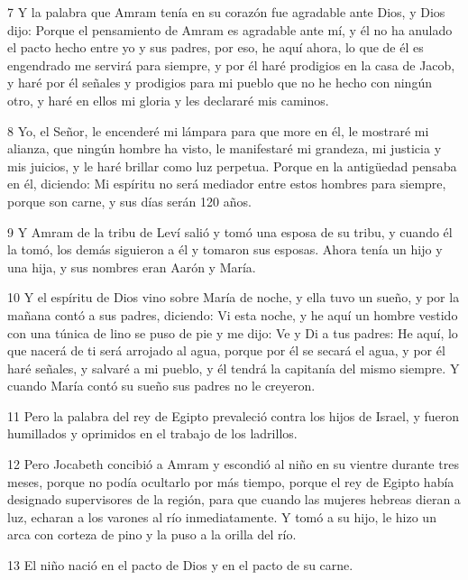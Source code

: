\par 7 Y la palabra que Amram tenía en su corazón fue agradable ante Dios, y Dios dijo: Porque el pensamiento de Amram es agradable ante mí, y él no ha anulado el pacto hecho entre yo y sus padres, por eso, he aquí ahora, lo que de él es engendrado me servirá para siempre, y por él haré prodigios en la casa de Jacob, y haré por él señales y prodigios para mi pueblo que no he hecho con ningún otro, y haré en ellos mi gloria y les declararé mis caminos.

\par 8 Yo, el Señor, le encenderé mi lámpara para que more en él, le mostraré mi alianza, que ningún hombre ha visto, le manifestaré mi grandeza, mi justicia y mis juicios, y le haré brillar como luz perpetua. Porque en la antigüedad pensaba en él, diciendo: Mi espíritu no será mediador entre estos hombres para siempre, porque son carne, y sus días serán 120 años.

\par 9 Y Amram de la tribu de Leví salió y tomó una esposa de su tribu, y cuando él la tomó, los demás siguieron a él y tomaron sus esposas. Ahora tenía un hijo y una hija, y sus nombres eran Aarón y María.

\par 10 Y el espíritu de Dios vino sobre María de noche, y ella tuvo un sueño, y por la mañana contó a sus padres, diciendo: Vi esta noche, y he aquí un hombre vestido con una túnica de lino se puso de pie y me dijo: Ve y Di a tus padres: He aquí, lo que nacerá de ti será arrojado al agua, porque por él se secará el agua, y por él haré señales, y salvaré a mi pueblo, y él tendrá la capitanía del mismo siempre. Y cuando María contó su sueño sus padres no le creyeron.

\par 11 Pero la palabra del rey de Egipto prevaleció contra los hijos de Israel, y fueron humillados y oprimidos en el trabajo de los ladrillos.

\par 12 Pero Jocabeth concibió a Amram y escondió al niño en su vientre durante tres meses, porque no podía ocultarlo por más tiempo, porque el rey de Egipto había designado supervisores de la región, para que cuando las mujeres hebreas dieran a luz, echaran a los varones al río inmediatamente. Y tomó a su hijo, le hizo un arca con corteza de pino y la puso a la orilla del río.

\par 13 El niño nació en el pacto de Dios y en el pacto de su carne.

